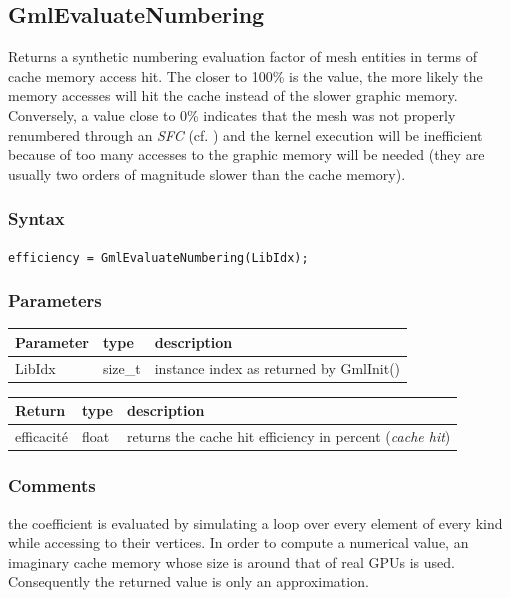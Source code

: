 \documentclass[a4paper,12pt]{article}
\begin{document}
\subsection{GmlEvaluateNumbering}
Returns a synthetic numbering evaluation factor of mesh entities in terms of cache memory access hit. The closer to 100\% is the value, the more likely the memory accesses will hit the cache instead of the slower graphic memory. Conversely, a value close to 0\% indicates that the mesh was not properly renumbered through an \emph{SFC} (cf. \cite{peano_hilbert}) and the kernel execution will be inefficient because of too many accesses to the graphic memory will be needed (they are usually two orders of magnitude slower than the cache memory).

\subsubsection*{Syntax}
{\tt efficiency = GmlEvaluateNumbering(LibIdx);}

\subsubsection*{Parameters}
\begin{tabular}{|m{2cm}|m{1.5cm}|m{10.5cm}|}
\hline
Parameter  & type    & description \\
\hline
LibIdx     & size\_t & instance index as returned by GmlInit() \\
\hline
\end{tabular}

\medskip

\begin{tabular}{|m{2cm}|m{1.5cm}|m{10.5cm}|}
\hline
Return     & type   & description \\
\hline
efficacité & float  & returns the cache hit efficiency in percent (\emph{cache hit}) \\
\hline
\end{tabular}

\subsubsection*{Comments}
the coefficient is evaluated by simulating a loop over every element of every kind while accessing to their vertices. In order to compute a numerical value, an imaginary cache memory whose size is around that of real GPUs is used. Consequently the returned value is only an approximation.
\end{document}
